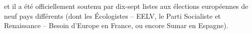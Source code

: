 et il a été officiellement soutenu par dix-sept listes aux élections européennes de neuf pays différents (dont les Écologistes – EELV, le Parti Socialiste et Renaissance – Besoin d'Europe en France, ou encore Sumar en Espagne). 